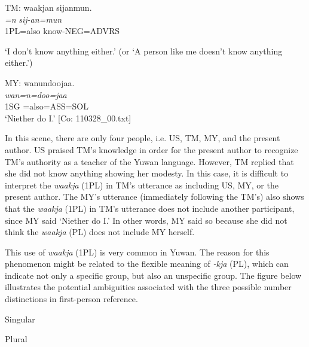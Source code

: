   TM: \glll  waakjan  sijanmun.\\
    \textit{=n}  \textit{sij-an=mun}\\
    1PL=also  know-NEG=ADVRS\\
    \glt {} \parbox{\linewidth-\widthof{TM:}}{‘I don’t know anything either.’ (or ‘A person like me doesn’t know anything either.’)}

MY: \glll  wanundoojaa.\\
\textit{wan=n=doo=jaa}\\
1SG =also=ASS=SOL\\
\glt {} ‘Niether do I.’ [Co: 110328\_00.txt]
\z

In this scene, there are only four people, i.e. US, TM, MY, and the present author. US praised TM’s knowledge in order for the present author to recognize TM’s authority as a teacher of the Yuwan language. However, TM replied that she did not know anything showing her modesty. In this case, it is difficult to interpret the \textit{waakja} (1PL) in TM’s utterance as including US, MY, or the present author. The MY’s utterance (immediately following the TM’s) also shows that the \textit{waakja} (1PL) in TM’s utterance does not include another participant, since MY said ‘Niether do I.’ In other words, MY said so because she did not think the \textit{waakja} (PL) does not include MY herself.

  This use of \textit{waakja} (1PL) is very common in Yuwan. The reason for this phenomenon might be related to the flexible meaning of \textit{{}-kja} (PL), which can indicate not only a specific group, but also an unspecific group. The figure below illustrates the potential ambiguities associated with the three possible number distinctions in first-person reference.


Singular

Plural

